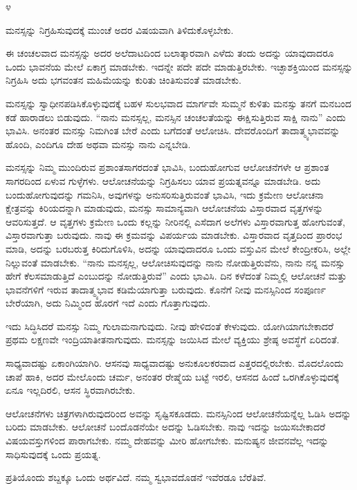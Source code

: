 \begin{center}
೪
\end{center}

ಮನಸ್ಸನ್ನು ನಿಗ್ರಹಿಸುವುದಕ್ಕೆ ಮುಂಚೆ ಅದರ ವಿಷಯವಾಗಿ ತಿಳಿದುಕೊಳ್ಳಬೇಕು.

ಈ ಚಂಚಲವಾದ ಮನಸ್ಸನ್ನು ಅದರ ಅಲೆದಾಟದಿಂದ ಬಲಾತ್ಕಾರವಾಗಿ ಎಳೆದು ತಂದು ಅದನ್ನು ಯಾವುದಾದರೂ ಒಂದು ಭಾವನೆಯ ಮೇಲೆ ಏಕಾಗ್ರ ಮಾಡಬೇಕು. ಇದನ್ನೇ ಪದೇ ಪದೇ ಮಾಡುತ್ತಿರಬೇಕು. ಇಚ್ಛಾಶಕ್ತಿಯಿಂದ ಮನಸ್ಸನ್ನು ನಿಗ್ರಹಿಸಿ ಅದು ಭಗವಂತನ ಮಹಿಮೆಯನ್ನು ಕುರಿತು ಚಿಂತಿಸುವಂತೆ ಮಾಡಬೇಕು.

ಮನಸ್ಸನ್ನು ಸ್ವಾಧೀನಪಡಿಸಿಕೊಳ್ಳುವುದಕ್ಕೆ ಬಹಳ ಸುಲಭವಾದ ಮಾರ್ಗವೇ ಸುಮ್ಮನೆ ಕುಳಿತು ಮನಸ್ಸು ತನಗೆ ಮನಬಂದ ಕಡೆ ಹಾರಾಡಲು ಬಿಡುವುದು. “ನಾನು ಮನಸ್ಸಲ್ಲ, ಮನಸ್ಸಿನ ಚಂಚಲತೆಯನ್ನು ಈಕ್ಷಿಸುತ್ತಿರುವ ಸಾಕ್ಷಿ ನಾನು'' ಎಂದು ಭಾವಿಸಿ. ಅನಂತರ ಮನಸ್ಸು ನಿಮಗಿಂತ ಬೇರೆ ಎಂದು ಬಗೆದಂತೆ ಆಲೋಚಿಸಿ. ದೇವರೊಂದಿಗೆ ತಾದಾತ್ಮ್ಯಭಾವವನ್ನು ಹೊಂದಿ, ಎಂದಿಗೂ ದೇಹ ಅಥವಾ ಮನಸ್ಸು ನಾನು ಎನ್ನಬೇಡಿ.

ಮನಸ್ಸನ್ನು ನಿಮ್ಮ ಮುಂದಿರುವ ಪ್ರಶಾಂತಸಾಗರದಂತೆ ಭಾವಿಸಿ, ಬಂದುಹೋಗುವ ಆಲೋಚನೆಗಳೇ ಆ ಪ್ರಶಾಂತ ಸಾಗರದಿಂದ ಏಳುವ ಗುಳ್ಳೆಗಳು. ಆಲೋಚನೆಯನ್ನು ನಿಗ್ರಹಿಸಲು ಯಾವ ಪ್ರಯತ್ನವನ್ನೂ ಮಾಡಬೇಡಿ. ಅದು ಬಂದುಹೋಗುವುದನ್ನು ಗಮನಿಸಿ, ಅವುಗಳನ್ನು ಅನುಸರಿಸುತ್ತಿರುವಂತೆ ಭಾವಿಸಿ, ಇದು ಕ್ರಮೇಣ ಆಲೋಚನಾ ಕ್ಷೇತ್ರವನ್ನು ಕಿರಿಯದನ್ನಾಗಿ ಮಾಡುವುದು, ಮನಸ್ಸು ಸಾಮಾನ್ಯವಾಗಿ ಆಲೋಚನೆಯ ವಿಸ್ತಾರವಾದ ವೃತ್ತಗಳನ್ನು ಆವರಿಸುತ್ತದೆ. ಆ ವೃತ್ತಗಳು ಕ್ರಮೇಣ ಒಂದು ಕಲ್ಲನ್ನು ನೀರಿನಲ್ಲಿ ಎಸೆದಾಗ ಅಲೆಗಳು ವಿಸ್ತಾರವಾಗುತ್ತ ಹೋಗುವಂತೆ, ವಿಸ್ತಾರವಾಗುತ್ತಾ ಬರುವುದು. ನಾವು ಈ ಕ್ರಮವನ್ನು ವಿಪರ್ಯಯ ಮಾಡಬೇಕು. ವಿಸ್ತಾರವಾದ ವೃತ್ತದಿಂದ ಪ್ರಾರಂಭ ಮಾಡಿ, ಅದನ್ನು ಬರಬರುತ್ತ ಕಿರಿದುಗೊಳಿಸಿ, ಅದನ್ನು ಯಾವುದಾದರೂ ಒಂದು ವಸ್ತುವಿನ ಮೇಲೆ ಕೇಂದ್ರೀಕರಿಸಿ, ಅಲ್ಲೇ ನಿಲ್ಲುವಂತೆ ಮಾಡಬೇಕು. “ನಾನು ಮನಸ್ಸಲ್ಲ, ಆಲೋಚಿಸುವುದನ್ನು ನಾನು ನೋಡುತ್ತಿರುವೆನು, ನಾನು ನನ್ನ ಮನಸ್ಸು ಹೇಗೆ ಕೆಲಸಮಾಡುತ್ತಿದೆ ಎಂಬುದನ್ನು ನೋಡುತ್ತಿರುವೆ'' ಎಂದು ಭಾವಿಸಿ. ದಿನ ಕಳೆದಂತೆ ನಿಮ್ಮಲ್ಲಿ ಆಲೋಚನೆ ಮತ್ತು ಭಾವನೆಗಳಿಗೆ ಇರುವ ತಾದಾತ್ಮ್ಯಭಾವ ಕಡಿಮೆಯಾಗುತ್ತಾ ಬರುವುದು. ಕೊನೆಗೆ ನೀವು ಮನಸ್ಸಿನಿಂದ ಸಂಪೂರ್ಣ ಬೇರೆಯಾಗಿ, ಅದು ನಿಮ್ಮಿಂದ ಹೊರಗೆ ಇದೆ ಎಂದು ಗೊತ್ತಾಗುವುದು.

ಇದು ಸಿದ್ಧಿಸಿದರೆ ಮನಸ್ಸು ನಿಮ್ಮ ಗುಲಾಮನಾಗುವುದು. ನೀವು ಹೇಳಿದಂತೆ ಕೇಳುವುದು. ಯೋಗಿಯಾಗಬೇಕಾದರೆ ಪ್ರಥಮ ಲಕ್ಷಣವೇ ಇಂದ್ರಿಯಾತೀತನಾಗುವುದು. ಮನಸ್ಸನ್ನು ಜಯಿಸಿದ ಮೇಲೆ ವ್ಯಕ್ತಿಯು ಶ್ರೇಷ್ಠ ಅವಸ್ಥೆಗೆ ಏರಿದಂತೆ.

ಸಾಧ್ಯವಾದಷ್ಟು ಏಕಾಂಗಿಯಾಗಿರಿ. ಆಸನವು ಸಾಧ್ಯವಾದಷ್ಟು ಅನುಕೂಲಕರವಾದ ಎತ್ತರದಲ್ಲಿರಬೇಕು. ಮೊದಲೊಂದು ಚಾಪೆ ಹಾಕಿ, ಅದರ ಮೇಲೊಂದು ಚರ್ಮ, ಅನಂತರ ರೇಷ್ಮೆಯ ಬಟ್ಟೆ ಇರಲಿ, ಆಸನದ ಹಿಂದೆ ಒರಗಿಕೊಳ್ಳುವುದಕ್ಕೆ ಏನೂ ಇಲ್ಲದಿರಲಿ, ಆಸನ ಸ್ಥಿರವಾಗಿರಬೇಕು.

ಆಲೋಚನೆಗಳು ಚಿತ್ರಗಳಾಗಿರುವುದರಿಂದ ಅವನ್ನು ಸೃಷ್ಟಿಸಕೂಡದು. ಮನಸ್ಸಿನಿಂದ ಆಲೋಚನೆಯನ್ನೆಲ್ಲ ಓಡಿಸಿ ಅದನ್ನು ಬರಿದು ಮಾಡಬೇಕು. ಆಲೋಚನೆ ಬಂದೊಡನೆಯೇ ಅದನ್ನು ಓಡಿಸಬೇಕು. ನಾವು ಇದನ್ನು ಜಯಿಸಬೇಕಾದರೆ ವಿಷಯವಸ್ತುಗಳಿಂದ ಪಾರಾಗಬೇಕು. ನಮ್ಮ ದೇಹವನ್ನು ಮೀರಿ ಹೋಗಬೇಕು. ಮನುಷ್ಯನ ಜೀವನವೆಲ್ಲ ಇದನ್ನು ಸಾಧಿಸುವುದಕ್ಕೆ ಒಂದು ಪ್ರಯತ್ನ.

ಪ್ರತಿಯೊಂದು ಶಬ್ದಕ್ಕೂ ಒಂದು ಅರ್ಥವಿದೆ. ನಮ್ಮ ಸ್ವಭಾವದೊಡನೆ ಇವೆರಡೂ ಬೆರೆತಿವೆ.

